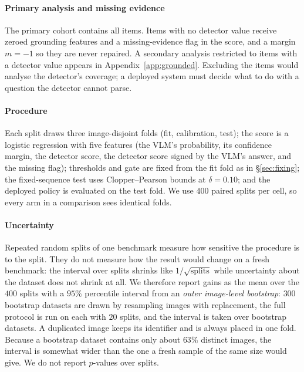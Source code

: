 \begin{table}[t]
\centering
\caption{Cohort flow. ``Detector value'' is the number of items for which the detector returned a score; the
remaining items stay in every analysis, keep the channel-1 decision, and cannot be repaired. In POPE the
exclusions are object phrases the extraction script failed to parse (POPE contains the typo ``imange''); in AMBER
they are the attribute and relation queries, which name no object. ICC is the intra-image correlation of the
model's errors.}
\label{tab:cohort}
\small
\resizebox{\textwidth}{!}{}
\end{table}

\paragraph{Primary analysis and missing evidence}
The primary cohort contains all items. Items with no detector value receive zeroed grounding features and a
missing-evidence flag in the score, and a margin $m=-1$ so they are never repaired. A secondary analysis restricted to
items with a detector value appears in Appendix~\ref{app:grounded}. Excluding the items would analyse the
detector's coverage; a deployed system must decide what to do with a question the detector cannot parse.

\paragraph{Procedure}
Each split draws three image-disjoint folds (fit, calibration, test); the score is a logistic regression with five
features (the VLM's probability, its confidence margin, the detector score, the detector score signed by the VLM's
answer, and the missing flag); thresholds and gate are fixed from the fit fold as in \S\ref{sec:fixing}; the
fixed-sequence test uses Clopper--Pearson bounds at $\delta=0.10$; and the deployed policy is evaluated on the test fold.
We use $400$ paired splits per cell, so every arm in a comparison sees identical folds.

\paragraph{Uncertainty}
Repeated random splits of one benchmark measure how sensitive the procedure is to the split. They do not
measure how the result would change on a fresh benchmark: the interval over splits shrinks like $1/\sqrt{\text{splits}}$ while
uncertainty about the dataset does not shrink at all. We therefore report gains as the mean over the $400$ splits
with a $95\%$ percentile interval from an \emph{outer image-level bootstrap}: $300$ bootstrap datasets
are drawn by resampling images with replacement, the full protocol is run on each with $20$ splits, and the
interval is taken over bootstrap datasets. A duplicated image keeps its identifier and is always placed in one fold. Because a
bootstrap dataset contains only about $63\%$ distinct images, the interval is somewhat wider than the one a
fresh sample of the same size would give. We do not report $p$-values over splits.

